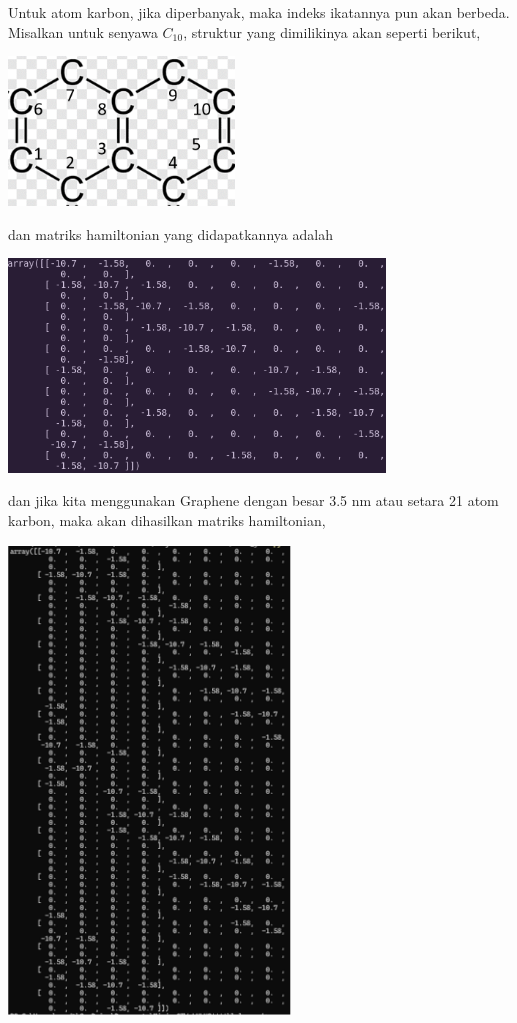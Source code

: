 \documentclass[12pt,a4paper]{report}
\begin{document}
Untuk atom karbon, jika diperbanyak, maka indeks ikatannya pun akan berbeda. Misalkan untuk senyawa $C_{10}$, struktur yang dimilikinya akan seperti berikut,
\begin{center}
	\includegraphics[width=6cm]{gambar/C10.png}
	\label{c10_structure}
\end{center}
dan matriks hamiltonian yang didapatkannya adalah
\begin{center}
	\includegraphics[width=10cm]{gambar/c10_hamiltonian.png}
	\label{c10_hamilton}
\end{center}
dan jika kita menggunakan Graphene dengan besar 3.5 nm atau setara 21 atom karbon, maka akan dihasilkan matriks hamiltonian,
\begin{center}
	\includegraphics[width=7.5cm]{gambar/graphene21_hamiltonian.png}
	\label{graphene21_hamilton}
\end{center}
\end{document}
